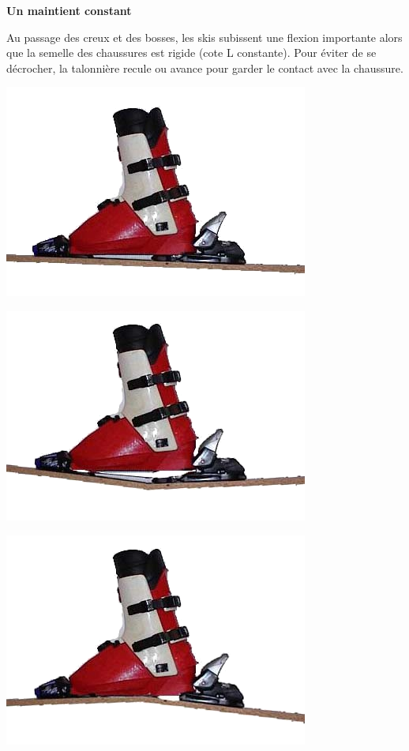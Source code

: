 \textbf{Un maintient constant}

Au passage des creux et des bosses, les skis subissent une flexion importante alors que la semelle des chaussures est rigide (cote L constante). Pour éviter de se décrocher, la talonnière recule ou avance pour garder le contact avec la chaussure.

 \begin{minipage}{0.3\linewidth}
   \centering\includegraphics[width=0.8\linewidth]{img/normal.png}
 \end{minipage}
 \hfill
  \begin{minipage}{0.3\linewidth}
   \centering\includegraphics[width=0.8\linewidth]{img/reduc.png}
  \end{minipage}
 \hfill
  \begin{minipage}{0.3\linewidth}
   \centering\includegraphics[width=0.8\linewidth]{img/augmen.png}
  \end{minipage}


